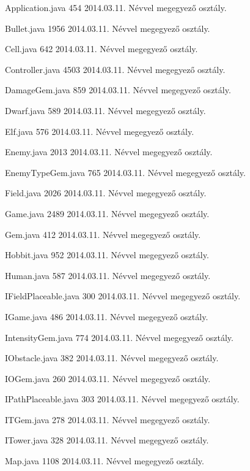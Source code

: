 \begin{fajllista}

\fajl
{Application.java}
{454}
{2014.03.11.}
{Névvel megegyező osztály.}

\fajl
{Bullet.java}
{1956}
{2014.03.11.}
{Névvel megegyező osztály.}

\fajl
{Cell.java}
{642}
{2014.03.11.}
{Névvel megegyező osztály.}

\fajl
{Controller.java}
{4503}
{2014.03.11.}
{Névvel megegyező osztály.}

\fajl
{DamageGem.java}
{859}
{2014.03.11.}
{Névvel megegyező osztály.}

\fajl
{Dwarf.java}
{589}
{2014.03.11.}
{Névvel megegyező osztály.}

\fajl
{Elf.java}
{576}
{2014.03.11.}
{Névvel megegyező osztály.}

\fajl
{Enemy.java}
{2013}
{2014.03.11.}
{Névvel megegyező osztály.}

\fajl
{EnemyTypeGem.java}
{765}
{2014.03.11.}
{Névvel megegyező osztály.}

\fajl
{Field.java}
{2026}
{2014.03.11.}
{Névvel megegyező osztály.}

\fajl
{Game.java}
{2489}
{2014.03.11.}
{Névvel megegyező osztály.}

\fajl
{Gem.java}
{412}
{2014.03.11.}
{Névvel megegyező osztály.}

\fajl
{Hobbit.java}
{952}
{2014.03.11.}
{Névvel megegyező osztály.}

\fajl
{Human.java}
{587}
{2014.03.11.}
{Névvel megegyező osztály.}

\fajl
{IFieldPlaceable.java}
{300}
{2014.03.11.}
{Névvel megegyező osztály.}

\fajl
{IGame.java}
{486}
{2014.03.11.}
{Névvel megegyező osztály.}

\fajl
{IntensityGem.java}
{774}
{2014.03.11.}
{Névvel megegyező osztály.}

\fajl
{IObstacle.java}
{382}
{2014.03.11.}
{Névvel megegyező osztály.}

\fajl
{IOGem.java}
{260}
{2014.03.11.}
{Névvel megegyező osztály.}

\fajl
{IPathPlaceable.java}
{303}
{2014.03.11.}
{Névvel megegyező osztály.}

\fajl
{ITGem.java}
{278}
{2014.03.11.}
{Névvel megegyező osztály.}

\fajl
{ITower.java}
{328}
{2014.03.11.}
{Névvel megegyező osztály.}

\fajl
{Map.java}
{1108}
{2014.03.11.}
{Névvel megegyező osztály.}


\end{fajllista}
